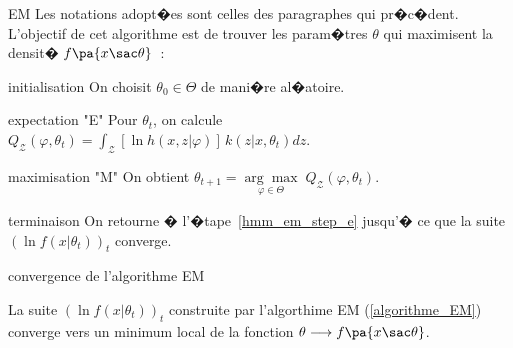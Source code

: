             \begin{xalgorithm}{EM}
            \label{algorithme_EM}
            Les notations adopt�es sont celles des paragraphes qui pr�c�dent. L'objectif de cet algorithme est de trouver 
            les param�tres $\theta$ qui maximisent la densit� $f\pa{x \sac \theta}$~:
            
            \begin{xalgostep}{initialisation}
                    On choisit $\theta_{0}\in\Theta$ de mani�re al�atoire.
            \end{xalgostep}
            
            \begin{xalgostep}{expectation "E"}\label{hmm_em_step_e}
                    Pour $\theta_{t}$, on calcule $Q_{\mathcal{Z}}\left(  \varphi,\theta _{t}\right)  =
                    \displaystyle\int_{\mathcal{Z}}\left[  \ln h\left(  x,z\left|
                    \varphi\right.  \right)  \right]  \,k\left(  z\left|  x,\theta_t\right.  \right) dz$.
            \end{xalgostep}
            
            \begin{xalgostep}{maximisation "M"}
                    On obtient $\theta_{t+1}=\underset{\varphi\in\Theta}{\arg\max }\;
                             Q_{\mathcal{Z}}\left(  \varphi,\theta_{t}\right)$.
            \end{xalgostep}
            
            \begin{xalgostep}{terminaison}
                    On retourne � l'�tape~\ref{hmm_em_step_e} jusqu'� ce que la suite 
                    $\left(  \ln f\left(  x\left| \theta_{t}\right. \right)\right)  _{t}$ converge.
            \end{xalgostep}
            
            \end{xalgorithm}
            
            
        \begin{xtheorem}{convergence de l'algorithme EM}\label{hmm_theorem_em}
        
        La suite $\left(  \ln f\left(  x\left| \theta_{t}\right. \right)\right)  _{t}$ construite par l'algorthime 
        EM (\ref{algorithme_EM})
        converge vers un minimum local de la fonction $\theta \longrightarrow f\pa{x \sac \theta}$.
        \end{xtheorem}
        
